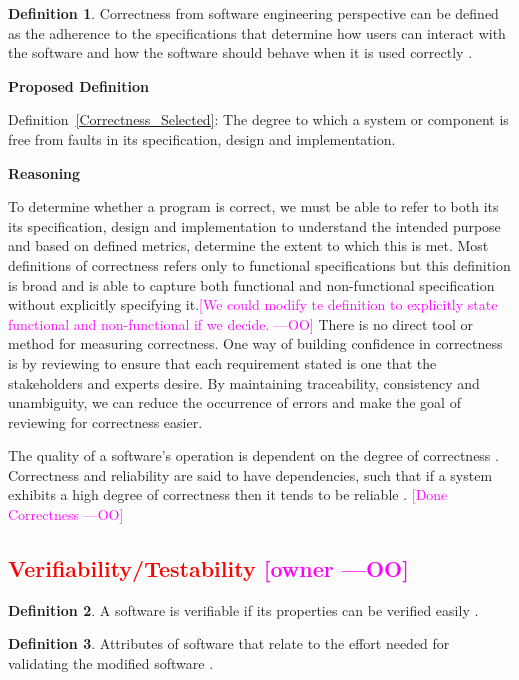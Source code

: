 \documentclass[letterpaper,cleveref]{lipics-v2019}
\newcommand{\authornote}[3]{\textcolor{#1}{[#3 ---#2]}}
\newcommand{\authornote}[3]{}
\newcommand{\oo}[1]{\authornote{magenta}{OO}{#1}} %
\newcommand{\notdone}[1]{\textcolor{red}{#1}}
\theoremstyle{definition}
\newtheorem{defn}{Definition}
\begin{document}
\begin{defn}
	Correctness from software engineering perspective can be defined as the adherence to the specifications that determine how users can interact with the software and how the software should behave when it is used correctly \citep{Tutorialspoint}.
\end{defn}

\noindent \textbf{Proposed Definition}

Definition~\ref{Correctness_Selected}: The degree to which a system or component is free from faults in its specification, design and implementation.

\noindent \textbf{Reasoning}

To determine whether a program is correct, we must be able to refer to both its its specification, design and implementation to understand the intended purpose and based on defined metrics, determine the extent to which this is met. Most definitions of correctness refers only to functional specifications but this definition is broad and is able to capture both functional and non-functional specification without explicitly specifying it.\oo{We could modify te definition to explicitly state functional and non-functional if we decide.}
There is no direct tool or method for measuring correctness. One way of building
confidence in correctness is by reviewing to ensure that each requirement stated
is one that the stakeholders and experts desire.  By maintaining traceability,
consistency and unambiguity, we can reduce the occurrence of errors and make the
goal of reviewing for correctness easier.

The quality of a software's operation is dependent on the degree of correctness
\citep{berander2005software}. Correctness and reliability are said to have
dependencies, such that if a system exhibits a high degree of correctness then
it tends to be reliable \citep{GhezziEtAl2003}. \oo{Done Correctness}

\subsection{\notdone{Verifiability/Testability} \oo{owner}}

\begin{defn}
	A software is verifiable if its properties can be verified easily
	\citep{GhezziEtAl2003}.
\end{defn}

\begin{defn}
	Attributes of software that relate to the effort needed for validating the modified software \citep{iso2001iec}.
\end{defn}
\end{document}
